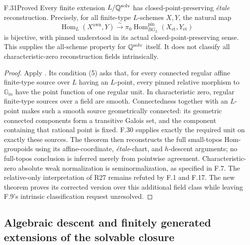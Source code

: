\begin{claim}{F.31}{Proved}
Every finite extension $L/\mathbb Q^{\mathrm{solv}}$ has
closed-point-preserving \emph{\'etale} reconstruction. Precisely,
for all finite-type $L$-schemes $X,Y$, the natural map
\[
 \operatorname{Hom}_L(X^{\mathrm{awn}},Y)
 \xrightarrow{\sim}
 \pi_0\operatorname{Hom}^{\mathrm{pin}}_{BG_L}
       (X_{\mathrm{et}},Y_{\mathrm{et}})
\]
is bijective, with pinned understood in its actual
closed-point-preserving sense. This supplies the all-scheme
property for $\mathbb Q^{\mathrm{solv}}$ itself. It does not classify
all characteristic-zero reconstruction fields intrinsically.
\end{claim}
\begin{proof}
Apply \citet[Theorem~4.18, equivalence of (1) and (5)]{F_CHW2024}.
Its condition (5) asks that, for every connected regular affine
finite-type source over $L$ having an $L$-point, every pinned
relative morphism to $\mathbb G_m$ have the point function of
one regular unit. In characteristic zero, regular finite-type
sources over a field are smooth. Connectedness together with
an $L$-point makes such a smooth source geometrically connected:
its geometric connected components form a transitive Galois set,
and the component containing that rational point is fixed.
F.30 supplies exactly the required unit on exactly these sources.
The theorem then reconstructs the full small-topos Hom-groupoids
using its affine-coordinate, \emph{\'etale}-chart, and $h$-descent
arguments; no full-topos conclusion is inferred merely from
pointwise agreement. Characteristic-zero absolute weak
normalization is seminormalization, as specified in F.7.
The relative-only interpretation of R27 remains refuted by
F.1 and F.17. The new theorem proves its corrected version
over this additional field class while leaving F.9's intrinsic
classification request unresolved.
\end{proof}


\subsection{Algebraic descent and finitely generated extensions of the solvable closure}

